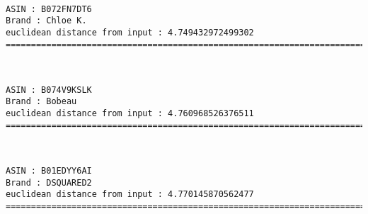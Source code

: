 \documentclass[11pt]{article}
\begin{document}
    
    
    \begin{center}
    \end{center}
    { \hspace*{\fill} \\}
    
    \begin{Verbatim}[commandchars=\\\{\}]
ASIN : B072FN7DT6
Brand : Chloe K.
euclidean distance from input : 4.749432972499302
=============================================================================================================================

    \end{Verbatim}

    
    
    \begin{center}
    \end{center}
    { \hspace*{\fill} \\}
    
    \begin{Verbatim}[commandchars=\\\{\}]
ASIN : B074V9KSLK
Brand : Bobeau
euclidean distance from input : 4.760968526376511
=============================================================================================================================

    \end{Verbatim}

    
    
    \begin{center}
    \end{center}
    { \hspace*{\fill} \\}
    
    \begin{Verbatim}[commandchars=\\\{\}]
ASIN : B01EDYY6AI
Brand : DSQUARED2
euclidean distance from input : 4.770145870562477
=============================================================================================================================

    \end{Verbatim}
\end{document}
